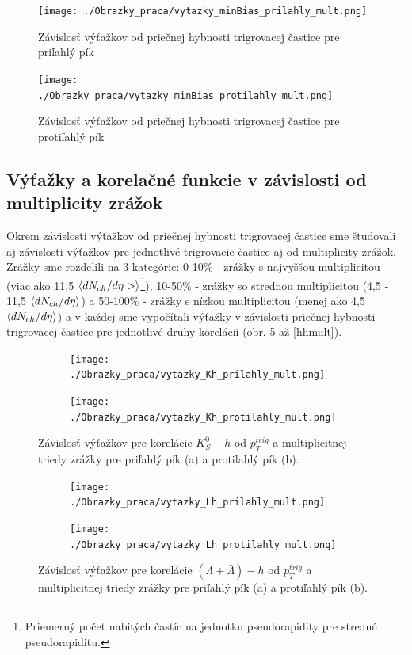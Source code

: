 \documentclass[thesismargins, thesislinespacing]{rnthesis}
\begin{document}
\begin{figure}[hbtp!]
	\centering
	\texttt{[image: ./Obrazky\_praca/vytazky\_minBias\_prilahly\_mult.png]}
	\caption{Závislosť výťažkov od priečnej hybnosti trigrovacej častice pre priľahlý pík}
	\label{near}
\end{figure}

\begin{figure}[hbtp!]
	\centering
	\texttt{[image: ./Obrazky\_praca/vytazky\_minBias\_protilahly\_mult.png]}
	\caption{Závislosť výťažkov od priečnej hybnosti trigrovacej častice pre protiľahlý pík}
	\label{away}
\end{figure}

\subsection{Výťažky a korelačné funkcie v závislosti od multiplicity zrážok}
Okrem závislosti výťažkov od priečnej hybnosti trigrovacej častice sme študovali aj závislosti výťažkov pre jednotlivé trigrovacie častice aj od multiplicity zrážok. Zrážky sme rozdelili na 3 kategórie: 0-10\% - zrážky s najvyššou multiplicitou (viac ako 11,5 $\braket{dN_{ch}/d\eta>}$\footnote{Priemerný počet nabitých častíc na jednotku pseudorapidity pre strednú pseudorapiditu.}), 10-50\% - zrážky so strednou multiplicitou (4,5 - 11,5 $\braket{dN_{ch}/d\eta}$) a 50-100\% - zrážky s nízkou multiplicitou (menej ako 4,5 $\braket{dN_{ch}/d\eta}$) a v každej sme vypočítali výťažky v závislosti priečnej hybnosti trigrovacej častice pre jednotlivé druhy korelácií (obr. \ref{K0mult} až \ref{hhmult}).
\begin{figure}
	\centering
	\begin{subfigure}{0.5\textwidth}
		\centering
		\texttt{[image: ./Obrazky\_praca/vytazky\_Kh\_prilahly\_mult.png]}
		\caption{}
		\label{K0pril}
	\end{subfigure}%
	\begin{subfigure}{0.5\textwidth}
		\centering
		\texttt{[image: ./Obrazky\_praca/vytazky\_Kh\_protilahly\_mult.png]}
		\caption{}
		\label{K0proti}
	\end{subfigure}
	\caption{Závislosť výťažkov pre korelácie $K^0_S - h$ od $p_T^{trig}$ a multiplicitnej triedy zrážky pre priľahlý pík (a) a protiľahlý pík (b).}
	\label{K0mult}
\end{figure}
\begin{figure}
	\centering
	\begin{subfigure}{0.5\textwidth}
		\centering
		\texttt{[image: ./Obrazky\_praca/vytazky\_Lh\_prilahly\_mult.png]}
		\caption{}
		\label{Lampril}
	\end{subfigure}%
	\begin{subfigure}{0.5\textwidth}
		\centering
		\texttt{[image: ./Obrazky\_praca/vytazky\_Lh\_protilahly\_mult.png]}
		\caption{}
		\label{Lamproti}
	\end{subfigure}
	\caption{Závislosť výťažkov pre korelácie $(\Lambda + \bar{\Lambda})- h$ od $p_T^{trig}$ a multiplicitnej triedy zrážky pre priľahlý pík (a) a protiľahlý pík (b).}
	\label{Lammult}
\end{figure}
\end{document}
